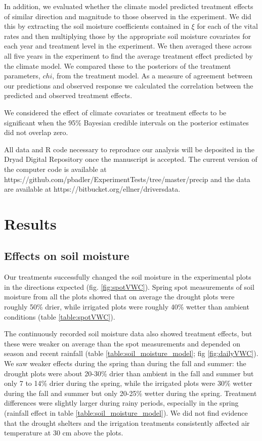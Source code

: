 \documentclass[11pt]{article}
\begin{document}
\begin{doublespacing}
In addition, we evaluated whether the climate model predicted treatment effects of similar direction and magnitude to those observed in the experiment.  We did this by extracting the soil moisture coefficients contained in $\xi$ for each of the vital rates and then multiplying those by the appropriate soil moisture covariates for each year and treatment level in the experiment.  We then averaged these across all five years in the experiment to find the average treatment effect predicted by the climate model.  We compared these to the posteriors of the treatment parameters, $chi$, from the treatment model.  As a measure of agreement between our predictions and observed response we calculated the correlation between the predicted and observed treatment effects. 

We considered the effect of climate covariates or treatment effects to be significant when the 95\% Bayesian credible intervals on the posterior estimates did not overlap zero.  

All data and R code necessary to reproduce our analysis will be deposited in the Dryad Digital Repository once the manuscript is accepted. The current version of the computer code is available at https://github.com/pbadler/ExperimentTests/tree/master/precip and the data are available at https://bitbucket.org/ellner/driversdata. 

\section*{Results}

\subsection*{Effects on soil moisture}

Our treatments successfully changed the soil moisture in the experimental plots in the directions expected (fig. \ref{fig:spotVWC}). Spring spot measurements of soil moisture from all the plots showed that on average the drought plots were roughly 50\% drier, while irrigated plots were roughly 40\% wetter than ambient conditions (table \ref{table:spotVWC}).
  
The continuously recorded soil moisture data also showed treatment effects, but these were weaker on average than the spot measurements and depended on season and recent rainfall (table \ref{table:soil_moisture_model}; fig \ref{fig:dailyVWC}). We saw weaker effects during the spring than during the fall and summer: the drought plots were about 20-30\% drier than ambient in the fall and summer but only 7 to 14\% drier during the spring, while the irrigated plots were 30\% wetter during the fall and summer but only 20-25\% wetter during the spring.  Treatment differences were slightly larger during rainy periods, especially in the spring (rainfall effect in table \ref{table:soil_moisture_model}). We did not find evidence that the drought shelters and the irrigation treatments consistently affected air temperature at 30 cm above the plots.  


\end{doublespacing}
\end{document}
